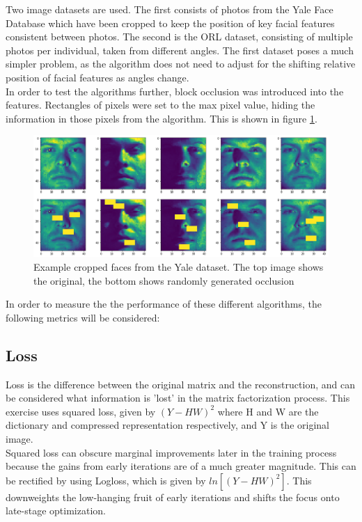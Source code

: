 \documentclass{article} %
\begin{document}
Two image datasets are used. The first consists of photos from the Yale Face Database which have been cropped to keep the position of key facial features consistent between photos. The second is the ORL dataset, consisting of multiple photos per individual, taken from different angles. The first dataset poses a much simpler problem, as the algorithm does not need to adjust for the shifting relative position of facial features as angles change.\\

In order to test the algorithms further, block occlusion was introduced into the features. Rectangles of pixels were set to the max pixel value, hiding the information in those pixels from the algorithm. This is shown in figure \ref{fig:examplefaces}.\\

\begin{figure}[h]
  \includegraphics[width=\textwidth]{examplefaces}
  \caption{Example cropped faces from the Yale dataset. The top image shows the original, the bottom shows randomly generated occlusion}
  \label{fig:examplefaces}
\end{figure}

In order to measure the the performance of these different algorithms, the following metrics will be considered:\\

\subsection{Loss}
Loss is the difference between the original matrix and the reconstruction, and can be considered what information is 'lost' in the matrix factorization process. This exercise uses squared loss, given by \((Y - HW)^2\) where H and W are the dictionary and compressed representation respectively, and Y is the original image.\\

Squared loss can obscure marginal improvements later in the training process because the gains from early iterations are of a much greater magnitude. This can be rectified by using Logloss, which is given by \(ln[ (Y - HW)^2 ]\). This downweights the low-hanging fruit of early iterations and shifts the focus onto late-stage optimization.\\
\end{document}
